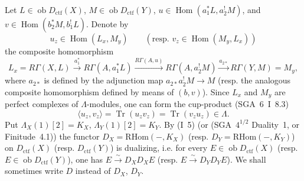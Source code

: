 \documentclass[11pt]{article}
\DeclareMathOperator{\Hom}{Hom}
\newcommand{\ob}{\operatorname{ob}}
\providecommand{\RHom}{\mathrm{RHom}}
\providecommand{\ctf}{\mathrm{ctf}}
\providecommand{\Tr}{\operatorname{Tr}}
\providecommand{\Tr}{\operatorname{Tr}}
\providecommand{\Tr}{\operatorname{Tr}}
\providecommand{\RHom}{\mathrm{RHom}}
\providecommand{\Hom}{\operatorname{Hom}}
\providecommand{\ob}{\operatorname{ob}}
\providecommand{\RHom}{\mathrm R\mathcal{H}om}
\providecommand{\Tr}{\operatorname{Tr}}
\providecommand{\RHom}{\mathrm{RHom}}
\begin{document}
Let $L\in \ob D_{\ctf}(X)$, $M\in \ob D_{\ctf}(Y)$, $u\in\Hom(a_1^*L,a_2^!M)$, and $v\in\Hom(b_2^*M,b_1^!L)$. Denote by
\[
u_z\in\Hom(L_x,M_y)\qquad (\text{resp. }v_z\in\Hom(M_y,L_x))
\]
the composite homomorphism
\[
L_x=R\Gamma(X,L)\xrightarrow{a_1^*}R\Gamma(A,a_1^*L)
\xrightarrow{R\Gamma(A,u)}R\Gamma(A,a_2^!M)
\xrightarrow{a_{2*}}R\Gamma(Y,M)=M_y,
\]
where $a_{2*}$ is defined by the adjunction map $a_{2*}a_2^!M\to M$ (resp. the analogous composite homomorphism defined by means of $(b,v)$). Since $L_x$ and $M_y$ are perfect complexes of $\Lambda$-modules, one can form the cup-product (SGA~6~I~8.3)
\begin{equation}\tag{1.1.1}
\langle u_z,v_z\rangle=\Tr(u_zv_z)=\Tr(v_zu_z)\in\Lambda.
\end{equation}
Put $\Lambda_X(1)[2]=K_X$, $\Lambda_Y(1)[2]=K_Y$. By (I~5) (or (SGA~$4^{1/2}$ Duality~1, or Finitude~4.1)) the functor $D_X=\RHom(-,K_X)$ (resp. $D_Y=\RHom(-,K_Y)$) on $D_{\ctf}(X)$ (resp. $D_{\ctf}(Y)$) is dualizing, i.e. for every $E\in\ob D_{\ctf}(X)$ (resp. $E\in\ob D_{\ctf}(Y)$), one has $E\xrightarrow{\sim}D_XD_XE$ (resp. $E\xrightarrow{\sim}D_YD_YE$). We shall sometimes write $D$ instead of $D_X$, $D_Y$.
\end{document}
